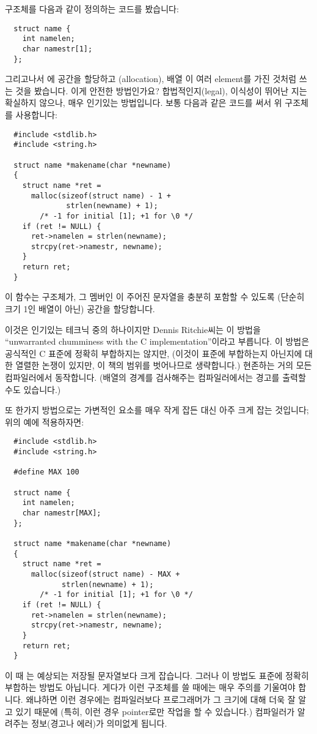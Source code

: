 \begin{faq}
	구조체를 다음과 같이 정의하는 코드를 봤습니다:
\begin{verbatim}
  struct name {
    int namelen;
    char namestr[1];
  };
\end{verbatim}
	그리고나서 에 공간을 할당하고 (allocation),
        배열 이 여러 element를 가진 것처럼 쓰는 것을 봤습니다. 이게
	안전한 방법인가요?
\A
        합법적인지(legal), 이식성이 뛰어난 지는 확실하지 않으나, 매우 인기있는
        방법입니다.
        보통 다음과 같은 코드를 써서 위 구조체를 사용합니다:
\begin{verbatim}
  #include <stdlib.h>
  #include <string.h>

  struct name *makename(char *newname)
  {
    struct name *ret =
      malloc(sizeof(struct name) - 1 + 
              strlen(newname) + 1);
        /* -1 for initial [1]; +1 for \0 */
    if (ret != NULL) {
      ret->namelen = strlen(newname);
      strcpy(ret->namestr, newname);
    }
    return ret;
  }
\end{verbatim}
        이 함수는  구조체가, 그 멤버인 이 주어진
        문자열을 충분히
        포함할 수 있도록 (단순히 크기 1인 배열이 아닌) 공간을 할당합니다.

	이것은 인기있는 테크닉 중의 하나이지만 Dennis Ritchie씨는
	이 방법을 ``unwarranted chumminess with the C implementation''이라고
	부릅니다.  이 방법은 공식적인 C 표준에 정확히 부합하지는 않지만,
        (이것이 표준에 부합하는지 아닌지에 대한 열렬한 논쟁이 있지만, 
        이 책의 범위를 벗어나므로 생략합니다.)
	현존하는 거의 모든 컴파일러에서 동작합니다.  (배열의 경계를
	검사해주는 컴파일러에서는 경고를 출력할 수도 있습니다.)


	또 한가지 방법으로는 가변적인 요소를 매우 작게 잡든 대신 아주 크게
	잡는 것입니다; 위의 예에 적용하자면:

\begin{verbatim}
  #include <stdlib.h>
  #include <string.h>

  #define MAX 100

  struct name {
    int namelen;
    char namestr[MAX];
  };

  struct name *makename(char *newname)
  {
    struct name *ret =
      malloc(sizeof(struct name) - MAX +
             strlen(newname) + 1);
        /* -1 for initial [1]; +1 for \0 */
    if (ret != NULL) {
      ret->namelen = strlen(newname);
      strcpy(ret->namestr, newname);
    }
    return ret;
  }
\end{verbatim}
	\noindent 이 때 는 예상되는 저장될 문자열보다 크게
	잡습니다.
	그러나 이 방법도 표준에 정확히 부합하는 방법도 아닙니다.
	게다가 이런 구조체를 쓸 때에는 매우 주의를 기울여야 합니다.
	왜냐하면 이런 경우에는 컴파일러보다 프로그래머가 그 크기에 대해
	더욱 잘 알고 있기 때문에 (특히, 이런 경우 pointer로만 작업을
	할 수 있습니다.) 컴파일러가 알려주는 정보(경고나 에러)가
	의미없게 됩니다.


\end{faq}
